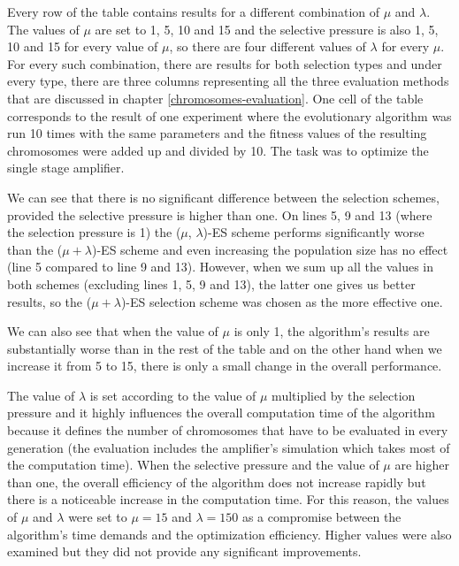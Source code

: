 Every row of the table contains results for a different combination of $\mu$ and $\lambda$. The values of $\mu$ are set to 1, 5, 10 and 15 and the selective pressure is also 1, 5, 10 and 15 for every value of $\mu$, so there are four different values of $\lambda$ for every $\mu$. For every such combination, there are results for both selection types and under every type, there are three columns representing all the three evaluation methods that are discussed in chapter \ref{chromosomes-evaluation}. One cell of the table corresponds to the result of one experiment where the evolutionary algorithm was run 10 times with the same parameters and the fitness values of the resulting chromosomes were added up and divided by 10. The task was to optimize the single stage amplifier.

We can see that there is no significant difference between the selection schemes, provided the selective pressure is higher than one. On lines 5, 9 and 13 (where the selection pressure is 1) the ($\mu$, $\lambda$)-ES scheme performs significantly worse than the ($\mu + \lambda$)-ES scheme and even increasing the population size has no effect (line 5 compared to line 9 and 13). However, when we sum up all the values in both schemes (excluding lines 1, 5, 9 and 13), the latter one gives us better results, so the ($\mu + \lambda$)-ES selection scheme was chosen as the more effective one.

We can also see that when the value of $\mu$ is only 1, the algorithm's results are substantially worse than in the rest of the table and on the other hand when we increase it from 5 to 15, there is only a small change in the overall performance.

The value of $\lambda$ is set according to the value of $\mu$ multiplied by the selection pressure and it highly influences the overall computation time of the algorithm because it defines the number of chromosomes that have to be evaluated in every generation (the evaluation includes the amplifier's simulation which takes most of the computation time). When the selective pressure and the value of $\mu$ are higher than one, the overall efficiency of the algorithm does not increase rapidly but there is a noticeable increase in the computation time. For this reason, the values of $\mu$ and $\lambda$ were set to $\mu = 15$ and $\lambda = 150$ as a compromise between the algorithm's time demands and the optimization efficiency. Higher values were also examined but they did not provide any significant improvements.

